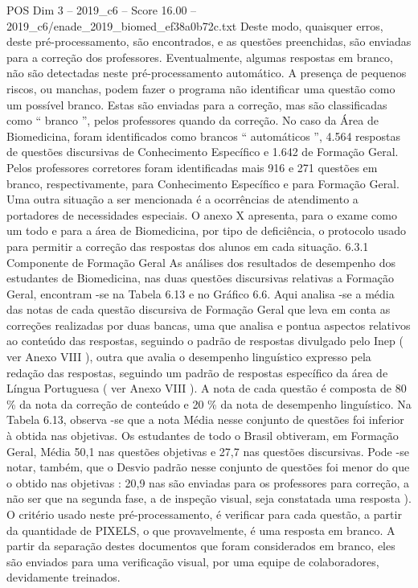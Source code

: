 \begin{textsample}{POS Dim 3 – 2019\_c6 – Score 16.00 – 2019\_c6/enade\_2019\_biomed\_ef38a0b72c.txt}
Deste modo, quaisquer erros, deste pré-processamento, são encontrados, e as questões preenchidas, são enviadas para a correção dos professores.
Eventualmente, algumas respostas em branco, não são detectadas neste pré-processamento automático.
A presença de pequenos riscos, ou manchas, podem fazer o programa não identificar uma questão como um possível branco.
Estas são enviadas para a correção, mas são classificadas como “ branco ”, pelos professores quando da correção.
No caso da Área de Biomedicina, foram identificados como brancos “ automáticos ”, 4.564 respostas de questões discursivas de Conhecimento Específico e 1.642 de Formação Geral.
Pelos professores corretores foram identificadas mais 916 e 271 questões em branco, respectivamente, para Conhecimento Específico e para Formação Geral.
Uma outra situação a ser mencionada é a ocorrências de atendimento a portadores de necessidades especiais.
O anexo X apresenta, para o exame como um todo e para a área de Biomedicina, por tipo de deficiência, o protocolo usado para permitir a correção das respostas dos alunos em cada situação. 6.3.1 Componente de Formação Geral As análises dos resultados de desempenho dos estudantes de Biomedicina, nas duas questões discursivas relativas a Formação Geral, encontram -se na Tabela 6.13 e no Gráfico 6.6.
Aqui analisa -se a média das notas de cada questão discursiva de Formação Geral que leva em conta as correções realizadas por duas bancas, uma que analisa e pontua aspectos relativos ao conteúdo das respostas, seguindo o padrão de respostas divulgado pelo Inep ( ver Anexo VIII ), outra que avalia o desempenho linguístico expresso pela redação das respostas, seguindo um padrão de respostas específico da área de Língua Portuguesa ( ver Anexo VIII ).
A nota de cada questão é composta de 80 \% da nota da correção de conteúdo e 20 \% da nota de desempenho linguístico.
Na Tabela 6.13, observa -se que a nota Média nesse conjunto de questões foi inferior à obtida nas objetivas.
Os estudantes de todo o Brasil obtiveram, em Formação Geral, Média 50,1 nas questões objetivas e 27,7 nas questões discursivas.
Pode -se notar, também, que o Desvio padrão nesse conjunto de questões foi menor do que o obtido nas objetivas : 20,9 nas são enviadas para os professores para correção, a não ser que na segunda fase, a de inspeção visual, seja constatada uma resposta ).
O critério usado neste pré-processamento, é verificar para cada questão, a partir da quantidade de PIXELS, o que provavelmente, é uma resposta em branco.
A partir da separação destes documentos que foram considerados em branco, eles são enviados para uma verificação visual, por uma equipe de colaboradores, devidamente treinados.

\end{textsample}
